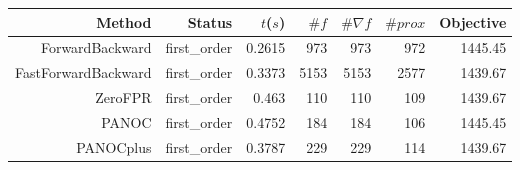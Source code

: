 \begin{tabular}{rrrrrrr}
  \toprule
  \textbf{Method} & \textbf{Status} & \textbf{$t$($s$)} & \textbf{$\#f$} & \textbf{$\#\nabla f$} & \textbf{$\#prox$} & \textbf{Objective} \\
  \midrule
  ForwardBackward & first\_order & 0.2615 & 973 & 973 & 972 & 1445.45 \\
  FastForwardBackward & first\_order & 0.3373 & 5153 & 5153 & 2577 & 1439.67 \\
  ZeroFPR & first\_order & 0.463 & 110 & 110 & 109 & 1439.67 \\
  PANOC & first\_order & 0.4752 & 184 & 184 & 106 & 1445.45 \\
  PANOCplus & first\_order & 0.3787 & 229 & 229 & 114 & 1439.67 \\
  \bottomrule
\end{tabular}
